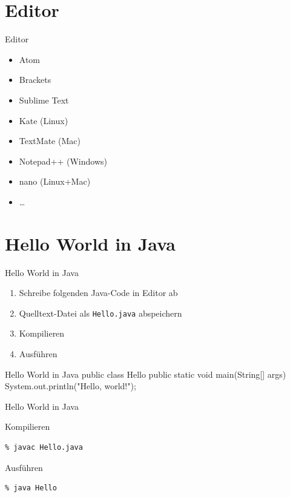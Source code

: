 \documentclass[18pt]{beamer}
\begin{document}
\section{Editor}

\begin{frame}{Editor}
    \begin{itemize}
        \pause
        \item Atom
        \pause
        \item Brackets
        \pause
        \item Sublime Text
        \pause
        \item Kate (Linux)
        \pause
        \item TextMate (Mac)
        \pause
        \item Notepad++ (Windows)
        \pause
        \item nano (Linux+Mac)
        \pause
        \item \dots
    \end{itemize}
\end{frame}

\section{Hello World in Java}

\begin{frame}{Hello World in Java}
    \begin{enumerate}
        \item Schreibe folgenden Java-Code in Editor ab
        \item Quelltext-Datei als \texttt{Hello.java} abspeichern
        \item Kompilieren
        \item Ausführen
    \end{enumerate}
\end{frame}

\begin{frame}[fragile]{Hello World in Java}
public class Hello {
    public static void main(String[] args) {
        System.out.println("Hello, world!");
    }
}
\end{frame}

\begin{frame}[fragile]{Hello World in Java}
    \begin{block}{Kompilieren}
        \begin{lstlisting}
% javac Hello.java
        \end{lstlisting}
    \end{block}
    \pause
    \begin{block}{Ausführen}
        \begin{lstlisting}
% java Hello
        \end{lstlisting}
    \end{block}
\end{frame}
\end{document}

